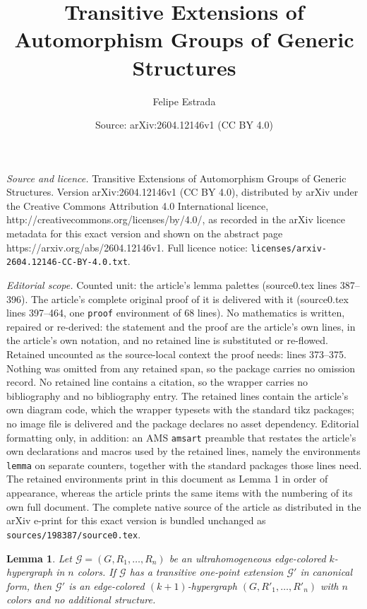\documentclass[10pt,a4paper]{amsart}
\title{Transitive Extensions of Automorphism Groups of Generic Structures}
\author{Felipe Estrada}
\date{Source: arXiv:2604.12146v1 (CC BY 4.0)}
\newtheorem{lemma}{Lemma}
\def\graph{\mathcal{G}}
\begin{document}
\maketitle

\noindent\emph{Source and licence.} Transitive Extensions of Automorphism Groups of Generic Structures. Version arXiv:2604.12146v1 (CC BY 4.0), distributed by arXiv under the Creative Commons Attribution 4.0 International licence, http://creativecommons.org/licenses/by/4.0/, as recorded in the arXiv licence metadata for this exact version and shown on the abstract page https://arxiv.org/abs/2604.12146v1. Full licence notice: \texttt{licenses/arxiv-2604.12146-CC-BY-4.0.txt}.\par\smallskip

\noindent\textit{Editorial scope.} Counted unit: the article's lemma palettes (source0.tex lines 387--396). The article's complete original proof of it is delivered with it (source0.tex lines 397--464, one \texttt{proof} environment of 68 lines). No mathematics is written, repaired or re-derived: the statement and the proof are the article's own lines, in the article's own notation, and no retained line is substituted or re-flowed.  Retained uncounted as the source-local context the proof needs: lines 373--375.  Nothing was omitted from any retained span, so the package carries no omission record.  No retained line contains a citation, so the wrapper carries no bibliography and no bibliography entry.  The retained lines contain the article's own diagram code, which the wrapper typesets with the standard tikz packages; no image file is delivered and the package declares no asset dependency.  Editorial formatting only, in addition: an AMS \texttt{amsart} preamble that restates the article's own declarations and macros used by the retained lines, namely the environments \texttt{lemma} on separate counters, together with the standard packages those lines need.  The retained environments print in this document as Lemma 1 in order of appearance, whereas the article prints the same items with the numbering of its own full document.  The complete native source of the article as distributed in the arXiv e-print for this exact version is bundled unchanged as \texttt{sources/198387/source0.tex}.
\begin{lemma}\label{Conditions for generic Graph extensions}
    Let $\graph = (G, R_1, \dots, R_n)$ be an ultrahomogeneous edge-colored $k$-hypergraph in $n$ colors. If $\graph$ has a transitive one-point extension $\graph'$ in canonical form, then $\graph'$ is an edge-colored $(k+1)$-hypergraph $(G, R'_1, \dots, R'_n)$ with $n$ colors and no additional structure.
\end{lemma}
\end{document}
